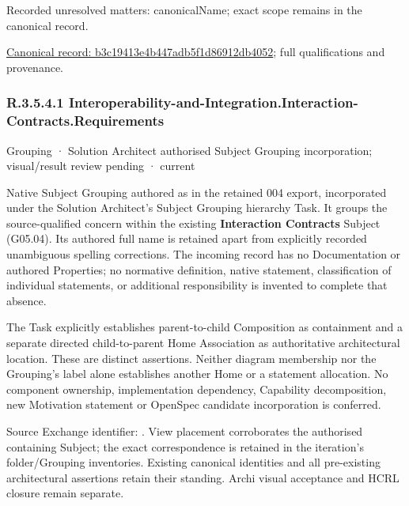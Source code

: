 {\small Recorded unresolved matters: canonicalName; exact scope remains in the canonical record.}\par
{\footnotesize \href{../../../../continuum/grouping/b3c19413e4b447adb5f1d86912db4052.md}{Canonical record: b3c19413e4b447adb5f1d86912db4052}; full qualifications and provenance.}\par
\subsubsection*{R.3.5.4.1 Interoperability-and-Integration.Interaction-Contracts.Requirements}
\label{navigation:R.3.5.4.1}

\label{element:55441c2677144a9da1c6348e633eaac8}
{\small Grouping · Solution Architect authorised Subject Grouping incorporation; visual/result review pending · current}\par

Native Subject Grouping authored as \texttt{} in the retained 004 export,
incorporated under the Solution Architect's Subject Grouping hierarchy Task.
It groups the source-qualified \texttt{} concern within
the existing \textbf{Interaction Contracts} Subject (G05.04). Its authored full name
is retained apart from explicitly recorded unambiguous spelling corrections.
The incoming record has no Documentation or authored Properties; no normative
definition, native statement, classification of individual statements, or
additional responsibility is invented to complete that absence.



The Task explicitly establishes parent-to-child Composition as containment and
a separate directed child-to-parent Home Association as authoritative architectural
location. These are distinct assertions. Neither diagram membership nor the
Grouping's label alone establishes another Home or a statement allocation.
No component ownership, implementation dependency, Capability decomposition,
new Motivation statement or OpenSpec candidate incorporation is conferred.



Source Exchange identifier: \texttt{}. View placement corroborates
the authorised containing Subject; the exact correspondence is retained in the
iteration's folder/Grouping inventories. Existing canonical identities and all
pre-existing architectural assertions retain their standing. Archi visual
acceptance and HCRL closure remain separate.


